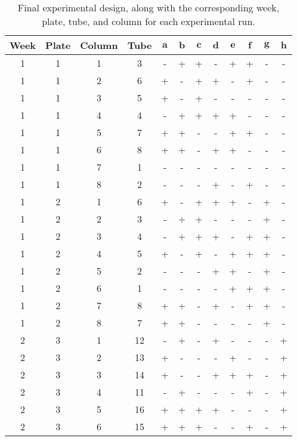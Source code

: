 \begin{table}[hbtp]
\centering
\caption{Final experimental design, along with the corresponding week, plate, tube, and column for each experimental run.} 
\label{tab:full_design_table}
\begin{tabular}{cccccccccccc}
  \toprule
Week & Plate & Column & Tube & $\mathbf{ a }$ & $\mathbf{ b }$ & $\mathbf{ c }$ & $\mathbf{ d }$ & $\mathbf{ e }$ & $\mathbf{ f }$ & $\mathbf{ g }$ & $\mathbf{ h }$ \\ 
  \midrule
1 & 1 & 1 & 3 & - & + & + & - & + & + & - & - \\ 
  1 & 1 & 2 & 6 & + & - & + & + & - & + & - & - \\ 
  1 & 1 & 3 & 5 & + & - & + & - & - & - & - & - \\ 
  1 & 1 & 4 & 4 & - & + & + & + & + & - & - & - \\ 
  1 & 1 & 5 & 7 & + & + & - & - & + & + & - & - \\ 
  1 & 1 & 6 & 8 & + & + & - & + & + & - & - & - \\ 
  1 & 1 & 7 & 1 & - & - & - & - & - & - & - & - \\ 
  1 & 1 & 8 & 2 & - & - & - & + & - & + & - & - \\ 
  1 & 2 & 1 & 6 & + & - & + & + & + & - & + & - \\ 
  1 & 2 & 2 & 3 & - & + & + & - & - & - & + & - \\ 
  1 & 2 & 3 & 4 & - & + & + & + & - & + & + & - \\ 
  1 & 2 & 4 & 5 & + & - & + & - & + & + & + & - \\ 
  1 & 2 & 5 & 2 & - & - & - & + & + & - & + & - \\ 
  1 & 2 & 6 & 1 & - & - & - & - & + & + & + & - \\ 
  1 & 2 & 7 & 8 & + & + & - & + & - & + & + & - \\ 
  1 & 2 & 8 & 7 & + & + & - & - & - & - & + & - \\ 
  2 & 3 & 1 & 12 & - & + & - & + & - & - & - & + \\ 
  2 & 3 & 2 & 13 & + & - & - & - & + & - & - & + \\ 
  2 & 3 & 3 & 14 & + & - & - & + & + & + & - & + \\ 
  2 & 3 & 4 & 11 & - & + & - & - & - & + & - & + \\ 
  2 & 3 & 5 & 16 & + & + & + & + & - & - & - & + \\ 
  2 & 3 & 6 & 15 & + & + & + & - & - & + & - & + \\ 

\end{tabular}
\end{table}
